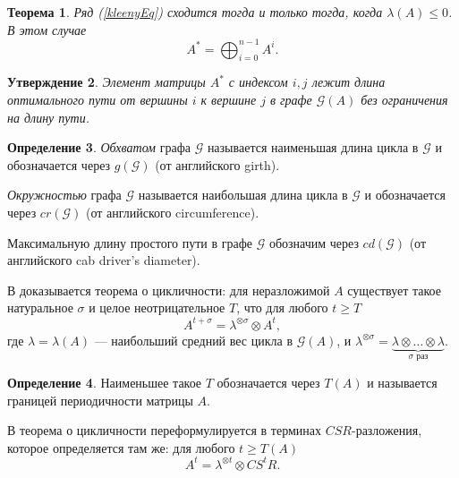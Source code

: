 \documentclass[12pt]{article}
\newtheorem{theorem}{Теорема}[section]
\newtheorem{proposition}[theorem]{Утверждение}
\theoremstyle{definition}
\newtheorem{definition}[theorem]{Определение}
\begin{document}
\begin{theorem} \cite[теорема 2.2, часть 1]{onVisualizationScaling}
Ряд (\ref{kleenyEq}) сходится тогда и только тогда, когда $\lambda(A) \le 0$. В этом случае 
\begin{equation*}
A^* = \bigoplus_{i = 0}^{n - 1} A^i.
\end{equation*}
\end{theorem}

\begin{proposition}\cite[равенство (8)]{15WeakCSRExpantion}
Элемент матрицы $A^*$ с индексом $i, j$ лежит длина оптимального пути от вершины $i$ к вершине $j$ в графе $\mathcal{G}(A)$ без ограничения на длину пути.
\end{proposition}

\begin{definition}
\textit{Обхватом} графа $\mathcal{G}$ называется наименьшая длина цикла в $\mathcal{G}$ и обозначается через $g(\mathcal{G})$ (от английского girth).

\textit{Окружностью} графа $\mathcal{G}$ называется наибольшая длина цикла в $\mathcal{G}$ и обозначается через $cr(\mathcal{G})$ (от английского circumference).

Максимальную длину простого пути в графе $\mathcal{G}$ обозначим через $cd(\mathcal{G})$ (от английского cab driver’s diameter).
\end{definition}

В \cite[теорема 3.9]{maxPlusAtWork} доказывается теорема о цикличности: для неразложимой $A$ существует такое натуральное $\sigma$ и целое неотрицательное $T$, что для любого $t \ge T$\begin{equation*}
A^{t + \sigma} = \lambda^{\otimes \sigma} \otimes A^t,
\end{equation*}
где $\lambda = \lambda(A)$ --- наибольший средний вес цикла в $\mathcal{G}(A)$, и $\lambda^{\otimes \sigma} = \underbrace{\lambda \otimes \dots \otimes \lambda}_{\sigma \text{ раз}}$.

\begin{definition}
Наименьшее такое $T$ обозначается через $T(A)$ и называется границей периодичности матрицы $A$.
\end{definition}

В \cite{maxAlgebraicPowers} теорема о цикличности переформулируется в терминах $CSR$-разложения, которое определяется там же: для любого $t \ge T(A)$\begin{equation*}
A^t = \lambda^{\otimes t} \otimes CS^tR.
\end{equation*}
\end{document}
